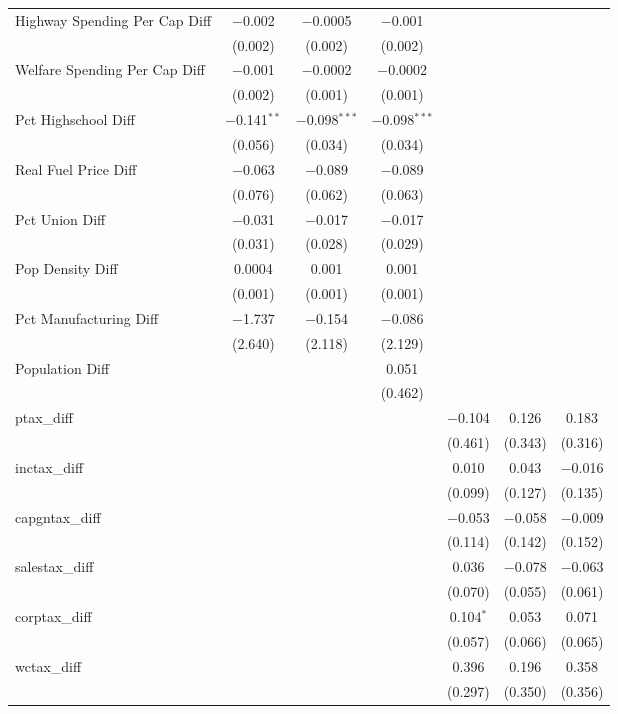 \begin{table}[!htbp]
\begin{tabular}{@{\extracolsep{5pt}}lcccccc}
  Highway Spending Per Cap Diff & $-$0.002 & $-$0.0005 & $-$0.001 &  &  &  \\ 
  & (0.002) & (0.002) & (0.002) &  &  &  \\ 
  Welfare Spending Per Cap Diff & $-$0.001 & $-$0.0002 & $-$0.0002 &  &  &  \\ 
  & (0.002) & (0.001) & (0.001) &  &  &  \\ 
  Pct Highschool Diff & $-$0.141$^{**}$ & $-$0.098$^{***}$ & $-$0.098$^{***}$ &  &  &  \\ 
  & (0.056) & (0.034) & (0.034) &  &  &  \\ 
  Real Fuel Price Diff & $-$0.063 & $-$0.089 & $-$0.089 &  &  &  \\ 
  & (0.076) & (0.062) & (0.063) &  &  &  \\ 
  Pct Union Diff & $-$0.031 & $-$0.017 & $-$0.017 &  &  &  \\ 
  & (0.031) & (0.028) & (0.029) &  &  &  \\ 
  Pop Density Diff & 0.0004 & 0.001 & 0.001 &  &  &  \\ 
  & (0.001) & (0.001) & (0.001) &  &  &  \\ 
  Pct Manufacturing Diff & $-$1.737 & $-$0.154 & $-$0.086 &  &  &  \\ 
  & (2.640) & (2.118) & (2.129) &  &  &  \\ 
  Population Diff &  &  & 0.051 &  &  &  \\ 
  &  &  & (0.462) &  &  &  \\ 
  ptax\_diff &  &  &  & $-$0.104 & 0.126 & 0.183 \\ 
  &  &  &  & (0.461) & (0.343) & (0.316) \\ 
  inctax\_diff &  &  &  & 0.010 & 0.043 & $-$0.016 \\ 
  &  &  &  & (0.099) & (0.127) & (0.135) \\ 
  capgntax\_diff &  &  &  & $-$0.053 & $-$0.058 & $-$0.009 \\ 
  &  &  &  & (0.114) & (0.142) & (0.152) \\ 
  salestax\_diff &  &  &  & 0.036 & $-$0.078 & $-$0.063 \\ 
  &  &  &  & (0.070) & (0.055) & (0.061) \\ 
  corptax\_diff &  &  &  & 0.104$^{*}$ & 0.053 & 0.071 \\ 
  &  &  &  & (0.057) & (0.066) & (0.065) \\ 
  wctax\_diff &  &  &  & 0.396 & 0.196 & 0.358 \\ 
  &  &  &  & (0.297) & (0.350) & (0.356) \\ 

\end{tabular}
\end{table}
